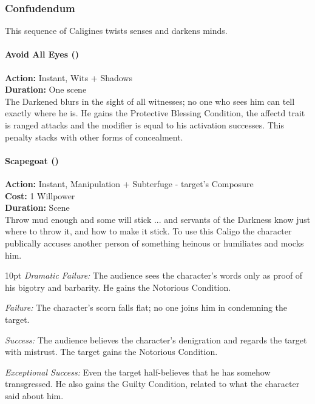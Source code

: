 \subsubsection*{Confudendum}

This sequence of Caligines twists senses and darkens minds.\\

\paragraph*{Avoid All Eyes (\textbullet)}

\noindent \textbf{Action:} Instant, Wits + Shadows\\

\noindent \textbf{Duration:} One scene\\

\noindent The Darkened blurs in the sight of all witnesses; no one who sees him can tell exactly where he is. He gains the Protective Blessing Condition, the affectd trait is ranged attacks and the modifier is equal to his activation successes. This penalty stacks with other forms of concealment.\\

\paragraph*{Scapegoat (\textbullet\textbullet)}

\noindent \textbf{Action:} Instant, Manipulation + Subterfuge - target's Composure\\

\noindent \textbf{Cost:} 1 Willpower\\

\noindent \textbf{Duration:} Scene \\

Throw mud enough and some will stick ... and servants of the Darkness know just where to throw it, and how to make it stick. To use this Caligo the character publically accuses another person of something heinous or humiliates and mocks him.

\begin{myindentpar}{10pt}  \emph{Dramatic Failure:}  The audience sees the character's words only as proof of his bigotry and barbarity. He gains the Notorious Condition.
   
    \emph{Failure:} The character's scorn falls flat; no one joins him in condemning the target.
    
    \emph{Success:} The audience believes the character's denigration and regards the target with mistrust. The target gains the Notorious Condition.
    
    \emph{Exceptional Success:} Even the target half-believes that he has somehow transgressed. He also gains the Guilty Condition, related to what the character said about him.\end{myindentpar}


